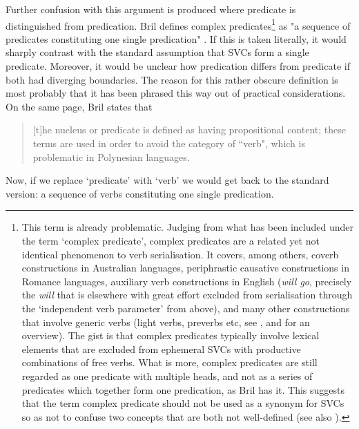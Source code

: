 Further confusion with this argument is produced where predicate is distinguished from predication. Bril defines complex predicates\footnote{This term is already problematic. Judging from what has been included under the term `complex predicate', complex predicates are a related yet not identical phenomenon to verb serialisation. It covers, among others, coverb constructions in Australian languages, periphrastic causative constructions in Romance languages, auxiliary verb constructions in English (\textit{will go}, precisely the \textit{will} that is elsewhere with great effort excluded from serialisation through the `independent verb parameter' from above), and many other constructions that involve generic verbs (light verbs, preverbs etc, see \citealt{alsina1997complex}, and \citealt{baker2010complex} for an overview). The gist is that complex predicates typically involve lexical elements that are excluded from ephemeral SVCs with productive combinations of free verbs. What is more, complex predicates are still regarded as one predicate with multiple heads, and not as a series of predicates which together form one predication, as Bril has it. This suggests that the term complex predicate should not be used as a synonym for SVCs so as not to confuse two concepts that are both not well-defined (see also \citealt[49]{butt2010light}).} as "a sequence of predicates constituting one single predication" \citep[268]{bril2007nexus}. If this is taken literally, it would sharply contrast with the standard assumption that SVCs form a single predicate. Moreover, it would be unclear how predication differs from predicate if both had diverging boundaries. The reason for this rather obscure definition is most probably that it has been phrased this way out of practical considerations. On the same page, Bril states that \begin{quote}[t]he nucleus or predicate is defined as having propositional content; these terms are used in order to avoid the category of ``verb", which is problematic in Polynesian languages.\end{quote} Now, if we replace `predicate' with `verb' we would get back to the standard version: a sequence of verbs constituting one single predication. 

